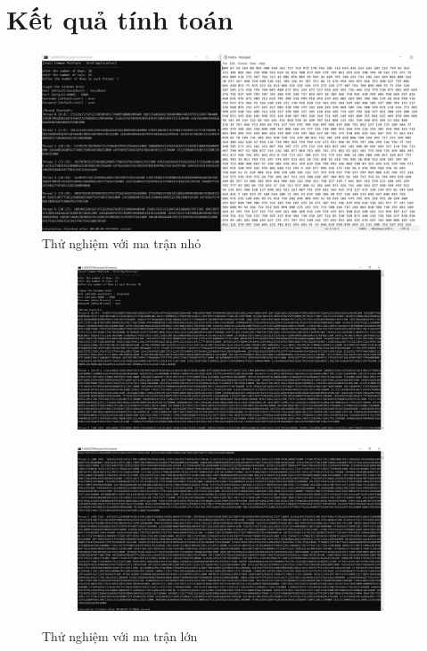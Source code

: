 \documentclass[12pt,a4paper]{report}
\begin{document}
\section{Kết quả tính toán}
\begin{center}
    \begin{figure}[htp]
    \begin{center}
     	\includegraphics[trim=0in 0in 0in 0in, clip, scale=.38]{./Figures/Problem_02/Res_Problem_02}
     	\caption{Thử nghiệm với ma trận nhỏ}
    \end{center}
    \end{figure}
\end{center}

\begin{figure}[htp]
\centering
\begin{subfigure}{.5\textwidth}
  \centering
  \includegraphics[width=\linewidth]{./Figures/Problem_02/Result_01}
  \label{fig:sub1}
\end{subfigure}%
\begin{subfigure}{.5\textwidth}
  \centering
  \includegraphics[width=\linewidth]{./Figures/Problem_02/Result_02}
  \label{fig:sub2}
\end{subfigure}
\caption{Thử nghiệm với ma trận lớn}
\label{fig:test}
\end{figure}
\end{document}
